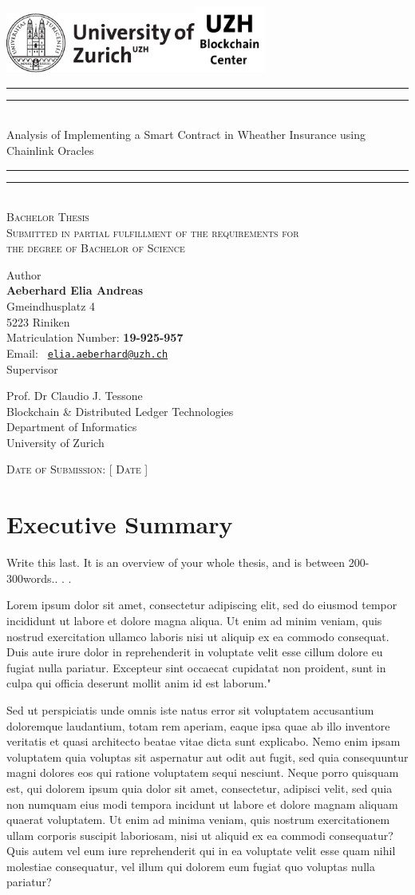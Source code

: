 \documentclass[11pt,a4paper,english,oneside]{book}
\makeatletter
\newcommand*{\uzhlogo}{\includegraphics[height=2cm]{Logo-UZH-black}}
\newcommand*{\bcclogo}{\includegraphics[height=2.2cm]{Logo-BCC-black}}
\newcommand*{\titleGP}{\begingroup %
\centering %
\vspace*{\baselineskip} %
\uzhlogo\hspace{8cm}\bcclogo\\[2\baselineskip] %

\rule{\textwidth}{1.6pt}\vspace*{-\baselineskip}\vspace*{2pt} %
\rule{\textwidth}{0.4pt}\\[\baselineskip] %
{\LARGE \sc Analysis of Implementing a Smart Contract in Wheather Insurance using Chainlink Oracles}\\[0.2\baselineskip] %
\rule{\textwidth}{0.4pt}\vspace*{-\baselineskip}\vspace{3.2pt} %
\rule{\textwidth}{1.6pt}\\[2\baselineskip] %
\scshape %
Bachelor Thesis\\[2\baselineskip]
Submitted in partial fulfillment of the requirements for \\ the degree of Bachelor of Science \par
\vspace*{2\baselineskip}
Author\\
{\Large \textbf{Aeberhard Elia Andreas} \\ [8pt]
 }
Gmeindhusplatz 4 \\ 5223 Riniken \\[5pt]
Matriculation Number: \textbf{19-925-957}\\[8pt]
 Email: \texttt{ \href{mailto:elia.aeberhard@uzh.ch} {elia.aeberhard@uzh.ch} }  \\


\vspace*{2\baselineskip}
Supervisor\\
{\Large Prof. Dr Claudio J. Tessone\\[8pt]
\small Blockchain \& Distributed Ledger Technologies\\[5pt]Department of Informatics \\[8pt]University of Zurich\par}
\vspace*{2\baselineskip}

\vfill
{\scshape Date of Submission: [ Date ]} \\[0.3\baselineskip]
\endgroup}
\makeatother
\begin{document}
\thispagestyle{empty}
\titleGP
\newpage
\onehalfspacing
\setcounter{page}{1}

\section*{Executive Summary}
\thispagestyle{firststyle}
Write  this  last.   It  is  an  overview  of  your  whole  thesis,  and  is  between  200-300words.. . .

Lorem ipsum dolor sit amet, consectetur adipiscing elit, sed do eiusmod tempor incididunt ut labore et dolore magna aliqua. Ut enim ad minim veniam, quis nostrud exercitation ullamco laboris nisi ut aliquip ex ea commodo consequat. Duis aute irure dolor in reprehenderit in voluptate velit esse cillum dolore eu fugiat nulla pariatur. Excepteur sint occaecat cupidatat non proident, sunt in culpa qui officia deserunt mollit anim id est laborum."

Sed ut perspiciatis unde omnis iste natus error sit voluptatem accusantium doloremque laudantium, totam rem aperiam, eaque ipsa quae ab illo inventore veritatis et quasi architecto beatae vitae dicta sunt explicabo. Nemo enim ipsam voluptatem quia voluptas sit aspernatur aut odit aut fugit, sed quia consequuntur magni dolores eos qui ratione voluptatem sequi nesciunt. Neque porro quisquam est, qui dolorem ipsum quia dolor sit amet, consectetur, adipisci velit, sed quia non numquam eius modi tempora incidunt ut labore et dolore magnam aliquam quaerat voluptatem. Ut enim ad minima veniam, quis nostrum exercitationem ullam corporis suscipit laboriosam, nisi ut aliquid ex ea commodi consequatur? Quis autem vel eum iure reprehenderit qui in ea voluptate velit esse quam nihil molestiae consequatur, vel illum qui dolorem eum fugiat quo voluptas nulla pariatur?


\tableofcontents
\listoffigures
\listoftables
\newpage
{}



%
%
% 

\newpage

\appendix
\noappendicestocpagenum
\addappheadtotoc
\appendixpage

\renewcommand{\theequation}{A.\arabic{equation}}


%

\printbibliography
\end{document}
